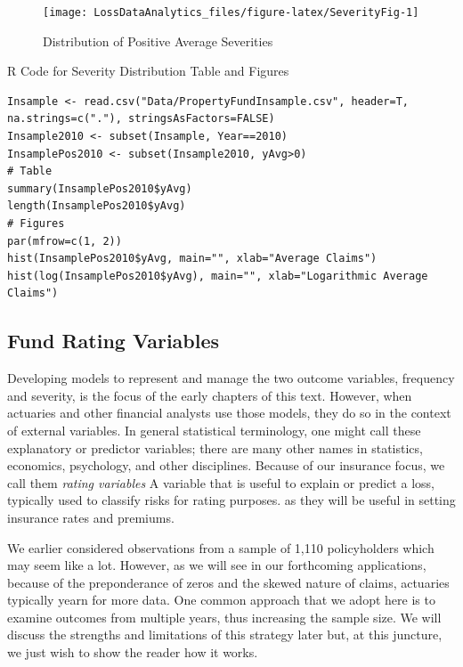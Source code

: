 \documentclass[]{book}
\theoremstyle{definition}
\theoremstyle{definition}
\theoremstyle{definition}
\theoremstyle{remark}
\begin{document}
\begin{figure}

{\centering \texttt{[image: LossDataAnalytics\_files/figure-latex/SeverityFig-1]} 

}

\caption{Distribution of Positive Average Severities}\label{fig:SeverityFig}
\end{figure}

R Code for Severity Distribution Table and Figures

\hypertarget{display.SeverityFig.2}{}
\begin{verbatim}
Insample <- read.csv("Data/PropertyFundInsample.csv", header=T, na.strings=c("."), stringsAsFactors=FALSE)
Insample2010 <- subset(Insample, Year==2010)
InsamplePos2010 <- subset(Insample2010, yAvg>0)
# Table
summary(InsamplePos2010$yAvg)
length(InsamplePos2010$yAvg)
# Figures
par(mfrow=c(1, 2))
hist(InsamplePos2010$yAvg, main="", xlab="Average Claims")
hist(log(InsamplePos2010$yAvg), main="", xlab="Logarithmic Average Claims")
\end{verbatim}

\subsection{Fund Rating Variables}\label{S:FundVariables}

Developing models to represent and manage the two outcome variables,
frequency and severity, is the focus of the early chapters of this text.
However, when actuaries and other financial analysts use those models,
they do so in the context of external variables. In general statistical
terminology, one might call these explanatory or predictor variables;
there are many other names in statistics, economics, psychology, and
other disciplines. Because of our insurance focus, we call them
\emph{rating variables}{ A variable that is useful to explain or predict
a loss, typically used to classify risks for rating purposes.} as they
will be useful in setting insurance rates and premiums.

We earlier considered observations from a sample of 1,110 policyholders
which may seem like a lot. However, as we will see in our forthcoming
applications, because of the preponderance of zeros and the skewed
nature of claims, actuaries typically yearn for more data. One common
approach that we adopt here is to examine outcomes from multiple years,
thus increasing the sample size. We will discuss the strengths and
limitations of this strategy later but, at this juncture, we just wish
to show the reader how it works.
\end{document}
